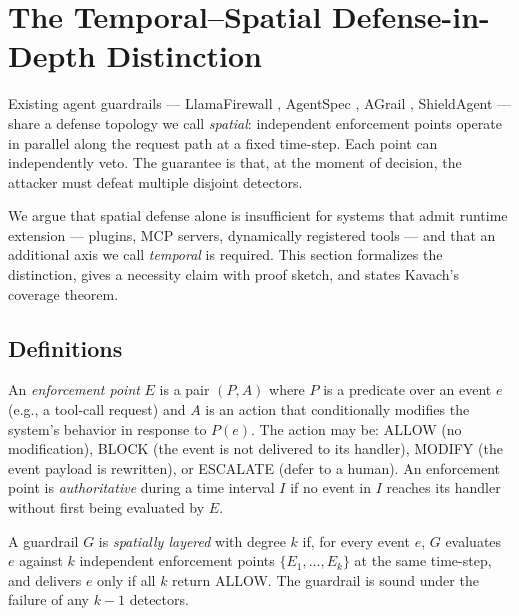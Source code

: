 
\section{The Temporal--Spatial Defense-in-Depth Distinction}
\label{sec:temporal-spatial}

Existing agent guardrails — LlamaFirewall \cite{saxe2025llamafirewall},
AgentSpec \cite{wang2025agentspec}, AGrail \cite{luo2025agrail},
ShieldAgent \cite{chen2025shieldagent} — share a defense topology we call
\emph{spatial}: independent enforcement points operate in parallel along the
request path at a fixed time-step. Each point can independently veto. The
guarantee is that, at the moment of decision, the attacker must defeat
multiple disjoint detectors.

We argue that spatial defense alone is insufficient for systems that admit
runtime extension — plugins, MCP servers, dynamically registered tools — and
that an additional axis we call \emph{temporal} is required. This section
formalizes the distinction, gives a necessity claim with proof sketch, and
states Kavach's coverage theorem.

\subsection{Definitions}

\begin{definition}
\label{def:enforcement-point}
An \emph{enforcement point} \(E\) is a pair \((P, A)\) where \(P\) is a
predicate over an event \(e\) (e.g., a tool-call request) and \(A\) is an
action that conditionally modifies the system's behavior in response to
\(P(e)\). The action may be: ALLOW (no modification), BLOCK (the event is
not delivered to its handler), MODIFY (the event payload is rewritten), or
ESCALATE (defer to a human). An enforcement point is \emph{authoritative}
during a time interval \(I\) if no event in \(I\) reaches its handler
without first being evaluated by \(E\).
\end{definition}

\begin{definition}
\label{def:spatial}
A guardrail \(G\) is \emph{spatially layered} with degree \(k\) if, for
every event \(e\), \(G\) evaluates \(e\) against \(k\) independent
enforcement points \(\{E_1, \dots, E_k\}\) at the same time-step, and
delivers \(e\) only if all \(k\) return ALLOW. The guardrail is sound under
the failure of any \(k-1\) detectors.
\end{definition}

